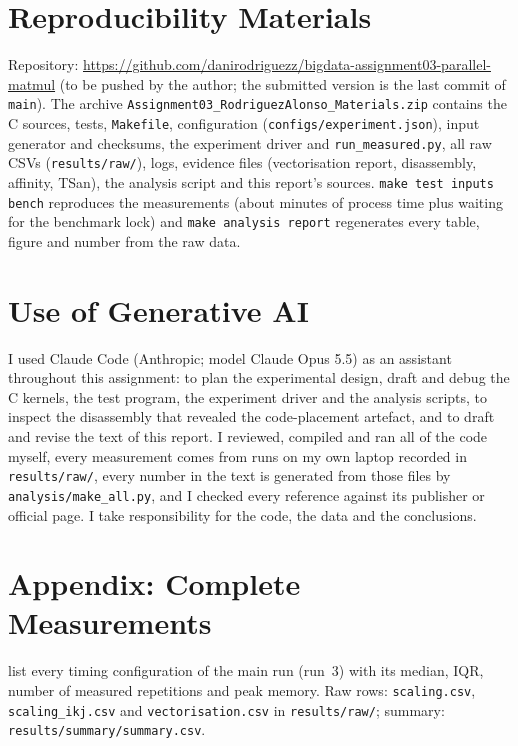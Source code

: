 \documentclass[conference,a4paper]{IEEEtran}
\begin{document}
\section*{Reproducibility Materials}
Repository: \url{https://github.com/danirodriguezz/bigdata-assignment03-parallel-matmul}
(to be pushed by the author; the submitted version is the last commit of \texttt{main}). The archive
\texttt{Assignment03\_RodriguezAlonso\_Materials.zip} contains the C sources, tests, \texttt{Makefile},
configuration (\texttt{configs/experiment.json}), input generator and checksums, the experiment
driver and \texttt{run\_measured.py}, all raw CSVs (\texttt{results/raw/}), logs, evidence files
(vectorisation report, disassembly, affinity, TSan), the analysis script and this report's sources.
\texttt{make test inputs bench} reproduces the measurements (about \MachineMinutes{} minutes of process time plus waiting for the benchmark lock) and
\texttt{make analysis report} regenerates every table, figure and number from the raw data.

\section*{Use of Generative AI}
I used Claude Code (Anthropic; model Claude Opus 5.5) as an assistant throughout this assignment: to plan the
experimental design, draft and debug the C kernels, the test program, the experiment driver and the analysis scripts, to
inspect the disassembly that revealed the code-placement artefact, and to draft and revise the text of this report. I
reviewed, compiled and ran all of the code myself, every measurement comes from runs on my own laptop recorded in
\texttt{results/raw/}, every number in the text is generated from those files by \texttt{analysis/make\_all.py}, and I
checked every reference against its publisher or official page. I take responsibility for the code, the data and the
conclusions.




\section*{Appendix: Complete Measurements}
 list every timing configuration of the main run (run~3) with its median, IQR, number of
measured repetitions and peak memory. Raw rows: \texttt{scaling.csv}, \texttt{scaling\_ikj.csv} and
\texttt{vectorisation.csv} in \texttt{results/raw/}; summary: \texttt{results/summary/summary.csv}.



\end{document}

